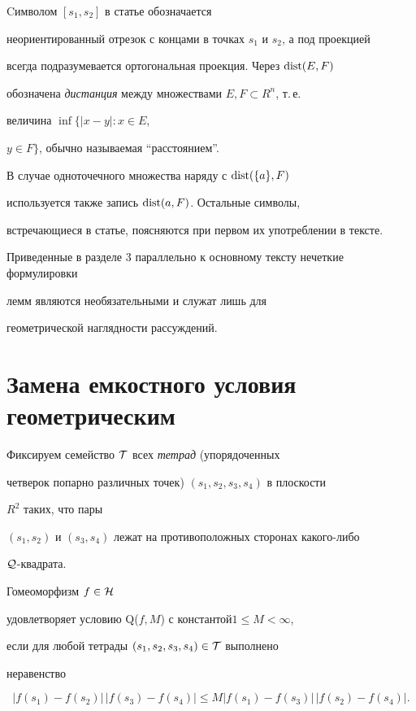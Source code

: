 Cимволом $[s_1, s_2]$ в статье обозначается 


неориентированный отрезок с концами в точках $s_1$ и $s_2$, а под проекцией 


всегда подразумевается ортогональная проекция. Через $\operatorname{dist}(E,F)$ 


обозначена {\it дистанция} между множествами $E,F \subset R^n$, т.\,е.


величина $\inf \{ |x-y| : x\in E$,


$y\in F\} $, обычно называемая ``расстоянием''. 


В случае одноточечного множества наряду с $\operatorname{dist}(\{ a\},F)$ 


используется также запись $\operatorname{dist}(a, F)$. Остальные символы, 


встречающиеся в статье, поясняются при первом их употреблении в тексте. 


Приведенные в разделе 3 параллельно к основному тексту нечеткие формулировки 


лемм являются необязательными и служат лишь для 


геометрической наглядности рассуждений.








\section{Замена емкостного условия геометрическим} 





Фиксируем семейство ${\cal T}$ всех {\it тетрад} (упорядоченных 


четверок попарно различных точек) $(s_1,s_2,s_3,s_4)$ в плоскости 


$R^2$ таких, что пары 


$(s_1, s_2)$ и $(s_3,s_4)$ лежат на противоположных сторонах какого-либо 


${\cal Q}$-квадрата.





\begin{defns}


Гомеоморфизм $f \in {\cal H}$


удовлетворяет условию Q($f, M$) с константой\linebreak $1\leq M < \infty$, 


если для любой тетрады $(s_1,s_2, s_3, s_4) \in {\cal T}$ выполнено 


неравенство


\begin{equation}


\label{Q}


|f(s_1) - f(s_2)|\, |f(s_3) - f(s_4)| \leq M |f(s_1) -f(s_3)|


\, |f(s_2) - f(s_4)|.


\end{equation}


\end{defns}





